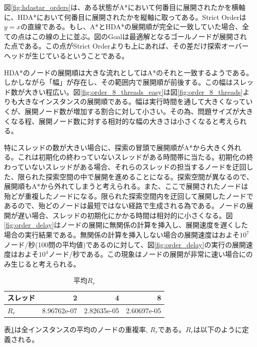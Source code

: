 \documentclass[uplatex]{jsarticle}
\begin{document}
図\ref{fig:hdastar_orders}は、ある状態がA*において何番目に展開されたかを横軸に、HDA*において何番目に展開されたかを縦軸に取ってある。Strict Orderは$y = x$の直線である。もし、A*とHDA*の展開順が完全に一致していた場合、全ての点はこの線の上に並ぶ。図のGoalは最適解となるゴールノードが展開された点である。この点がStrict Orderよりも上にあれば、その差だけ探索オーバーヘッドが生じているということである。

HDA*のノードの展開順は大きな流れとしてはA*のそれと一致するようである。しかしながら「幅」が存在し、その範囲内で展開順が前後する。この幅はスレッド数が大きい程広い。図\ref{fig:order_8_threads_easy}は図\ref{fig:order_8_threads}よりも大きなインスタンスの展開順である。幅は実行時間を通して大きくなっていくが、展開ノード数が増加する割合に対して小さい。その為、問題サイズが大きくなる程、展開ノード数に対する相対的な幅の大きさは小さくなると考えられる。

特にスレッドの数が大きい場合に、探索の冒頭で展開順がA*から大きく外れる。これは初期化の終わっていないスレッドがある時間帯に当たる。初期化の終わっていないスレッドがある場合、それらのスレッドの担当するノードを迂回した、限られた探索空間の中で展開を進めることになる。探索空間が異なるので、展開順もA*から外れてしまうと考えられる。また、ここで展開されたノードは殆どが重複したノードになる。限られた探索空間内を迂回して展開したノードであるので、殆どのノードは最短ではない経路で生成される為である。ノードの展開が遅い場合、スレッドの初期化にかかる時間は相対的に小さくなる。図\ref{fig:order_delay}はノードの展開に無関係の計算を挿入し、展開速度を遅くした場合の実行結果である。無関係の計算を挿入しない場合の展開速度はおよそ$10^7$ノード/秒(100問の平均値)であるのに対して、図\ref{fig:order_delay}の実行の展開速度はおよそ$10^4$ノード/秒である。この現象はノードの展開が非常に速い場合にのみ生じると考えられる。


\begin{table}
	\centering
	\begin{tabular}{lrrr} \hline
		スレッド  & 2 & 4 & 8 \\ \hline
		$R_{r}$ & 8.96762e-07 & 2.82635e-05 & 2.60697e-05 \\ \hline
	\end{tabular}
	\caption{平均$R_{r}$}
	\label{hdastar_duplication}
\end{table}


表\ref{hdastar_duplication}は全インスタンスの平均のノードの重複率, $R_{r}$である。$R_{r}$は以下のように定義される。
\end{document}
